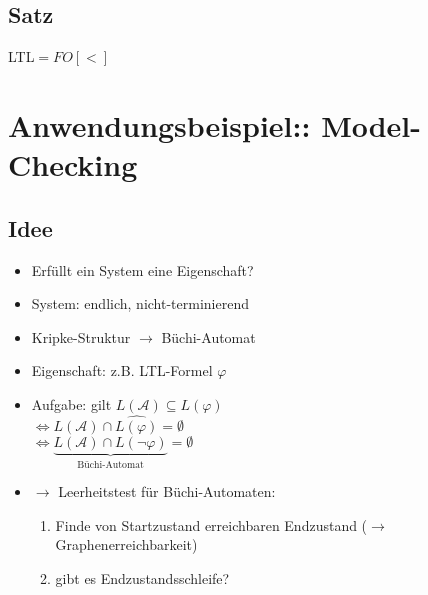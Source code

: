     \subsection{Satz}
        LTL$=FO[<]$\pagebreak
\section{Anwendungsbeispiel:: Model-Checking}
    \subsection{Idee}
        \begin{itemize}
            \item Erfüllt ein System eine Eigenschaft?
            \item System: endlich, nicht-terminierend
            \item Kripke-Struktur $\rightarrow$ Büchi-Automat
            \item Eigenschaft: z.B. LTL-Formel $\varphi$
            \item Aufgabe: gilt $L(\mathcal{A})\subseteq L(\varphi)$\\
            $\Leftrightarrow L(\mathcal{A})\cap\widehat{L(\varphi)}=\emptyset$\\
            $\Leftrightarrow \underbrace{L(\mathcal{A})\cap L(\neg\varphi)}_{\text{Büchi-Automat}}=\emptyset$
            \item $\rightarrow$ Leerheitstest für Büchi-Automaten:
            \begin{enumerate}
                \item Finde von Startzustand erreichbaren Endzustand ($\rightarrow$ Graphenerreichbarkeit)
                \item gibt es Endzustandsschleife?
            \end{enumerate}
        \end{itemize}
